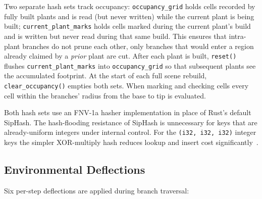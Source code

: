 \medskip
Two separate hash sets track occupancy: \texttt{occupancy\_grid} holds cells recorded by fully built plants
and is read (but never written) while the current plant is being built; \texttt{current\_plant\_marks} holds
cells marked during the current plant's build and is written but never read during that same build. This
ensures that intra-plant branches do not prune each other, only branches that would enter a region already
claimed by a \emph{prior} plant are cut. After each plant is built, \texttt{reset()} flushes
\texttt{current\_plant\_marks} into \texttt{occupancy\_grid} so that subsequent plants see the accumulated
footprint. At the start of each full scene rebuild, \texttt{clear\_occupancy()} empties both sets. When
marking and checking cells every cell within the branches' radius from the base to tip is evaluated.

\medskip
Both hash sets use an FNV-1a hasher implementation in place of Rust's default SipHash. The hash-flooding
resistance of SipHash is unnecessary for keys that are already-uniform integers under internal control. For
the \texttt{(i32, i32, i32)} integer keys the simpler XOR-multiply hash reduces lookup and insert cost
significantly~\cite{fowlerFNVNonCryptographicHash2026,aumassonSipHashFastShortInput2012}.

\subsection{Environmental Deflections}

Six per-step deflections are applied during branch traversal:

